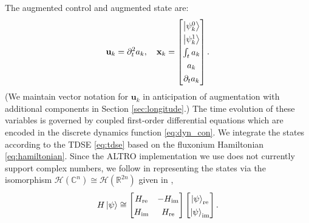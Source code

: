 The augmented control and augmented state are:
\begin{equation}
  \begingroup
  \renewcommand*{\arraystretch}{1.3}
  \mathbf{u}_{k} = \partial^{2}_{t} {a}_{k} , \quad
  \mathbf{x}_{k} = \begin{bmatrix} \ket{\psi^{0}_{k}} \\ \ket{\psi^{1}_{k}}
    \\ \int_{t} a_{k} \\ a_{k} \\ \partial_{t} a_{k} \end{bmatrix}.
  \endgroup
  \label{eq:astatecontrols}
\end{equation}
(We maintain vector notation for $\mathbf{u}_k$ in anticipation of augmentation with additional components in Section \ref{sec:longitude}.)
The time evolution of these variables is governed by 
 coupled first-order differential equations
which are encoded in the discrete dynamics function \eqref{eq:dyn_con}.
We integrate the states according to the TDSE \eqref{eq:tdse} based on the
fluxonium Hamiltonian \eqref{eq:hamiltonian}.
Since the ALTRO implementation we use does not currently
support complex numbers, we follow \cite{leung2017speedup} in  representing the states
via the isomorphism $\mathcal{H}(\mathbb{C}^{n})
\cong \mathcal{H}(\mathbb{R}^{2n})$ given in \cite{leung2017speedup},
\begin{equation}
  H \ket{\psi} \cong \begin{bmatrix} H_{\textrm{re}} & -H_{\textrm{im}}
    \\ H_{\textrm{im}} & H_{\textrm{re}}\end{bmatrix}
  \begin{bmatrix} \ket{\psi}_{\textrm{re}} \\ \ket{\psi}_{\textrm{im}}\end{bmatrix}.
  \label{eq:isomorphism}
\end{equation}

